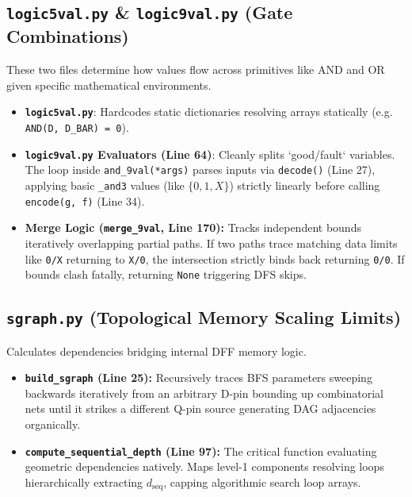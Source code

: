 \documentclass[12pt, a4paper]{article}
\begin{document}
\subsection{\texttt{logic5val.py} \& \texttt{logic9val.py} (Gate Combinations)}
These two files determine how values flow across primitives like AND and OR given specific mathematical environments.
\begin{itemize}
    \item \textbf{\texttt{logic5val.py}}: Hardcodes static dictionaries resolving arrays statically (e.g. \texttt{AND(D, D\_BAR) = 0}).
    \item \textbf{\texttt{logic9val.py} Evaluators (Line 64)}: Cleanly splits `good/fault` variables. The loop inside \texttt{and\_9val(*args)} parses inputs via \texttt{decode()} (Line 27), applying basic \texttt{\_and3} values (like $\{0,1,X\}$) strictly linearly before calling \texttt{encode(g, f)} (Line 34).
    \item \textbf{Merge Logic (\texttt{merge\_9val}, Line 170):} Tracks independent bounds iteratively overlapping partial paths. If two paths trace matching data limits like \texttt{0/X} returning to \texttt{X/0}, the intersection strictly binds back returning \texttt{0/0}. If bounds clash fatally, returning \texttt{None} triggering DFS skips.
\end{itemize}

\subsection{\texttt{sgraph.py} (Topological Memory Scaling Limits)}
Calculates dependencies bridging internal DFF memory logic.
\begin{itemize}
    \item \textbf{\texttt{build\_sgraph} (Line 25):} Recursively traces BFS parameters sweeping backwards iteratively from an arbitrary D-pin bounding up combinatorial nets until it strikes a different Q-pin source generating DAG adjacencies organically.
    \item \textbf{\texttt{compute\_sequential\_depth} (Line 97):} The critical function evaluating geometric dependencies natively. Maps level-1 components resolving loops hierarchically extracting $d_{\text{seq}}$, capping algorithmic search loop arrays.
\end{itemize}
\end{document}
